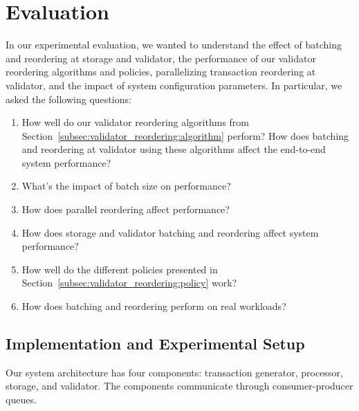 \section{Evaluation}\label{sec:experiments}
In our experimental evaluation, we wanted to understand the effect of batching and reordering at storage and validator, the performance of our validator reordering algorithms and policies, parallelizing transaction reordering at validator, and the impact of system configuration parameters. In particular, we asked the following questions:
\begin{enumerate}
\item\vspace{-.8em} How well do our validator reordering algorithms from Section~\ref{subsec:validator_reordering:algorithm} perform? How does batching and reordering at validator using these algorithms affect the end-to-end system performance?
\item\vspace{-.8em} What's the impact of batch size on performance? 
\item\vspace{-.8em} How does parallel reordering affect performance?
\item\vspace{-.8em} How does storage and validator batching and reordering
  affect system performance?
\item\vspace{-.8em} How well do the different policies presented in
  Section~\ref{subsec:validator_reordering:policy} work?
\item\vspace{-.8em} How does batching and reordering perform on real workloads?
\end{enumerate}

\subsection{Implementation and Experimental Setup}
\label{subsec:experiment:implementation}


Our system architecture has four components: transaction generator, processor, storage, and validator. The components communicate through consumer-producer queues.

